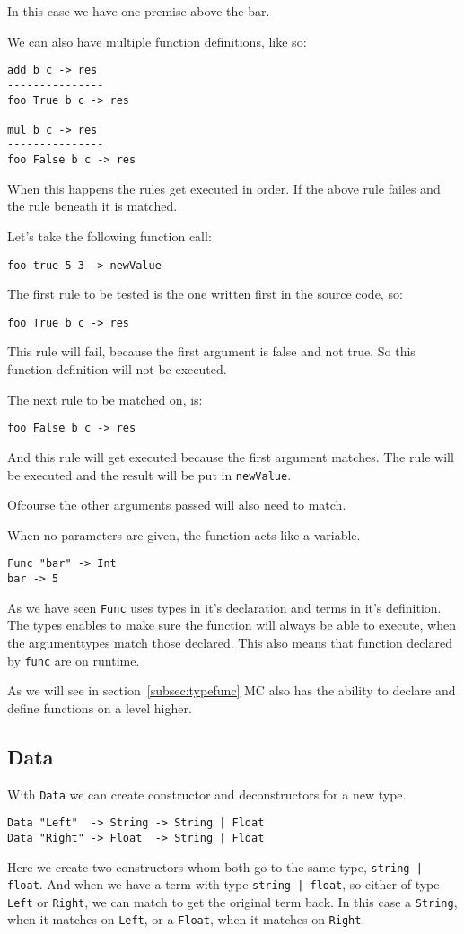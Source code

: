 In this case we have one premise above the bar.

We can also have multiple function definitions, like so:
\begin{lstlisting}
add b c -> res
---------------
foo True b c -> res

mul b c -> res
---------------
foo False b c -> res
\end{lstlisting}

When this happens the rules get executed in order.
If the above rule failes and the rule beneath it is matched.

Let's take the following function call:
\begin{lstlisting}
foo true 5 3 -> newValue
\end{lstlisting}

The first rule to be tested is the one written first in the source code, so:
\begin{lstlisting}
foo True b c -> res
\end{lstlisting}
This rule will fail, because the first argument is false and not true.
So this function definition will not be executed.

The next rule to be matched on, is:
\begin{lstlisting}
foo False b c -> res
\end{lstlisting}
And this rule will get executed because the first argument matches.
The rule will be executed and the result will be put in \verb|newValue|.

Ofcourse the other arguments passed will also need to match.

When no parameters are given, the function acts like a variable.
\begin{lstlisting}
Func "bar" -> Int
bar -> 5
\end{lstlisting}

As we have seen \verb|Func| uses types in it's declaration and terms in it's definition.
The types enables to make sure the function will always be able to execute, when the argumenttypes match those declared.
This also means that function declared by \verb|func| are on runtime.

As we will see in section~\ref{subsec:typefunc} MC also has the ability to declare and define functions on a level higher.

\subsection{Data}
With \verb|Data| we can create constructor and deconstructors for a new type.
\begin{lstlisting}
Data "Left"  -> String -> String | Float
Data "Right" -> Float  -> String | Float
\end{lstlisting}
Here we create two constructors whom both go to the same type, \verb_string | float_.
And when we have a term with type \verb_string | float_, so either of type \verb|Left| or \verb|Right|, we can match to get the original term back.
In this case a \verb|String|, when it matches on \verb|Left|, or a \verb|Float|, when it matches on \verb|Right|.

